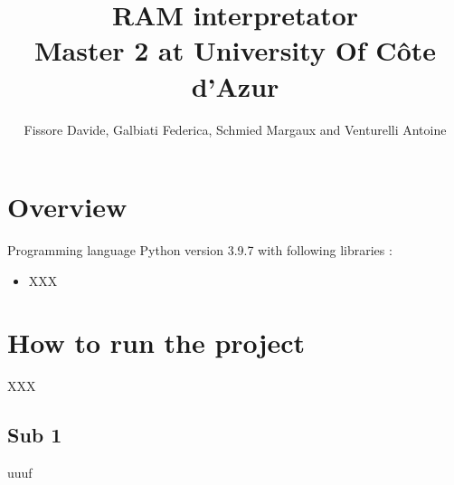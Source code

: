 \documentclass[a4paper, 11pt]{article}
\begin{document}
\title{
  RAM interpretator \\
  \large Master 2 at University Of Côte d'Azur
}
\author{Fissore Davide, Galbiati Federica, Schmied Margaux and Venturelli Antoine}
\maketitle
\tableofcontents

\section{Overview}
Programming language Python version 3.9.7 with following libraries :
\begin{itemize}
  \item XXX
\end{itemize}
\section{ How to run the project }
XXX
\subsection{Sub 1}
uuuf
\end{document}
